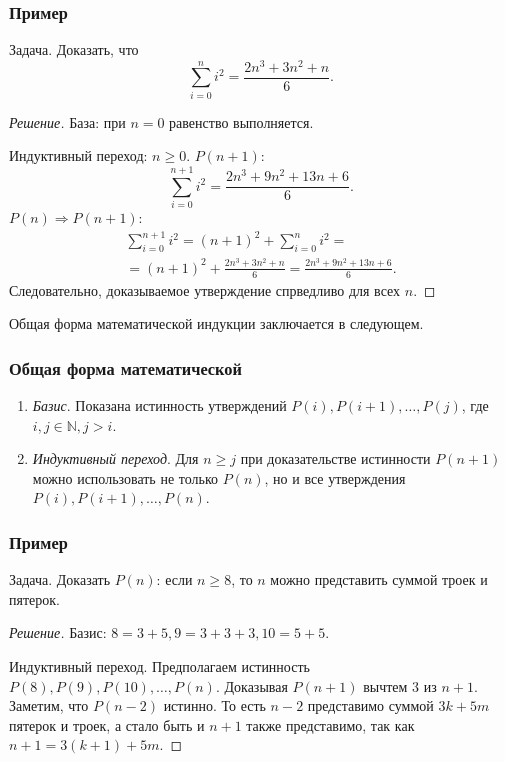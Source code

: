 \begin{frame}[allowframebreaks]
    \frametitle{Пример}
    \begin{example}
        Задача. Доказать, что 
        \[
            \sum_{i=0}^{n}i^2=\frac{2n^3+3n^2+n}{6}.
        \]
    \end{example}
    \begin{proof}[Решение]
        База: при $n=0$ равенство выполняется.
        
        Индуктивный переход: $n\geq 0$.  $P(n+1)$:
        \[
            \sum_{i=0}^{n+1}i^2=\frac{2n^3+9n^2+13n+6}{6}.
        \]
        $P(n)\Rightarrow P(n+1)$:
        \[
            \begin{split}
                \sum_{i=0}^{n+1}i^2=(n+1)^2+\sum_{i=0}^{n}i^2=\\
                =(n+1)^2+\frac{2n^3+3n^2+n}{6}=\frac{2n^3+9n^2+13n+6}{6}.
            \end{split}
        \]
        Следовательно, доказываемое утверждение спрведливо для всех $n$.
    \end{proof}
\end{frame}

Общая форма математической индукции заключается в следующем.
\begin{frame}
    \frametitle{Общая форма математической}
    \begin{enumerate}
        \item<1-> \emph{Базис}. Показана истинность утверждений $P(i),P(i+1),\ldots,P(j)$, где $i,j\in\mathbb{N},j>i$.
        \item<2-> \emph{Индуктивный переход}. Для $n\geq j$ при доказательстве истинности $P(n+1)$ можно использовать не только $P(n)$, но и все утверждения $P(i),P(i+1),\ldots,P(n)$.
    \end{enumerate}
\end{frame}

\begin{frame}[allowframebreaks]
    \frametitle{Пример}
    \begin{example}
        Задача. Доказать $P(n)$: если $n\geq 8$, то $n$ можно представить суммой троек и пятерок.
    \end{example}
    \begin{proof}[Решение]
            Базис: $8=3+5, 9=3+3+3, 10=5+5$. 
            
            Индуктивный переход. Предполагаем истинность $P(8),P(9),P(10),\ldots,P(n)$. Доказывая $P(n+1)$ вычтем $3$ из $n+1$. Заметим, что $P(n-2)$ истинно. То есть $n-2$ представимо суммой $3k+5m$ пятерок и троек, а стало быть и $n+1$ также представимо, так как $n+1=3(k+1)+5m$.
    \end{proof}
\end{frame}


